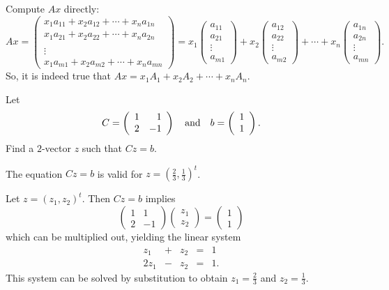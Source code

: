 \documentclass{ximera}
\begin{document}
\begin{exercise}
\begin{solution}

Compute $Ax$ directly:
\[ Ax = \left(\begin{array}{c} x_1a_{11} + x_2a_{12} + \cdots +
x_na_{1n} \\  x_1a_{21} + x_2a_{22} + \cdots + x_na_{2n} \\
\\ \vdots \\ x_1a_{m1} + x_2a_{m2} + \cdots + x_na_{mn}
\end{array}\right) = x_1\left(\begin{array}{r} a_{11} \\ a_{21} \\
\vdots \\ a_{m1} \end{array}\right) + x_2\left(\begin{array}{r}
a_{12} \\ a_{22} \\ \vdots \\ a_{m2} \end{array}\right) + \cdots
+ x_n\left(\begin{array}{r} a_{1n} \\ a_{2n} \\
\vdots \\ a_{mn} \end{array}\right). \]
So, it is indeed true that $Ax = x_1A_1 + x_2A_2 + \cdots
+ x_nA_n$.


\end{solution}
\end{exercise}


\begin{exercise} \label{c4.1.3}
Let
\[
C = \left(\begin{array}{rr} 1 & 1\\ 2 &-1\end{array}\right) \quad\mbox{and}\quad b = \left(\begin{array}{r} 1 \\ 1\end{array}\right).
\]
Find a $2$-vector $z$ such that $Cz=b$.

\begin{solution}

\ans The equation $Cz = b$ is valid for $z = (\frac{2}{3},\frac{1}{3})^t$.

\soln Let $z = (z_1,z_2)^t$.  Then $Cz = b$ implies
\[
\left(\begin{array}{rr} 1 & 1 \\ 2 & -1\end{array}\right)
\left(\begin{array}{r} z_1 \\ z_2\end{array}\right) =
\left(\begin{array}{r} 1 \\ 1\end{array}\right)
\]
which can be multiplied out, yielding the linear system
\[\begin{array}{rrrrl}
z_1 & + & z_2 & = & 1 \\
2z_1 & - & z_2 & = & 1.\end{array} \]
This system can be solved by substitution to obtain $z_1 =
\frac{2}{3}$ and $z_2 = \frac{1}{3}$.

\end{solution}
\end{exercise}
\end{document}
